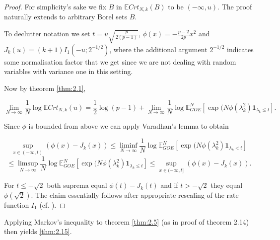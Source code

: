\begin{proof}
	For simplicity's sake we fix $B$ in $\mathbb E Crt_{N,k}(B)$ to be $(-\infty,u)$. The proof naturally extends to arbitrary Borel sets $B$.
	
	To declutter notation we set $t=u\sqrt{\frac{p}{2(p-1)}}$, $\phi(x)=-\frac{p-2}{2p}x^2$ and $J_k(u)=(k+1)I_1(-u;2^{-1/2})$, where the additional argument $2^{-1/2}$ indicates some normalisation factor that we get since we are not dealing with random variables with variance one in this setting.
	
	Now by theorem \ref{thm:2.1},
	
	$$\lim_{N\rightarrow\infty}\frac{1}{N}\log\mathbb E Crt_{N,k}(u) = 
	\frac{1}{2}\log(p-1) + \lim_{N\rightarrow\infty}\frac{1}{N}\log\mathbb E_{GOE}^N[\exp(N\phi(\lambda_k^2)\mathbf 1_{\lambda_k\leq t}].$$
	
	Since $\phi$ is bounded from above we can apply Varadhan's lemma to obtain
	
	$$\sup_{x\in(-\infty,t)}(\phi(x)-J_k(x))\leq\liminf_{N\rightarrow\infty}\frac{1}{N}\log\mathbb E_{GOE}^N[\exp(N\phi(\lambda_k^2)\mathbf 1_{\lambda_k<t}]$$
	$$\leq\limsup_{N\rightarrow\infty}\frac{1}{N}\log\mathbb E_{GOE}^N[\exp(N\phi(\lambda_k^2)\mathbf 1_{\lambda_k\leq t}]\leq\sup_{x\in(-\infty,t]}(\phi(x)-J_k(x)).$$
	
	For $t\leq-\sqrt 2$ both suprema equal $\phi(t)-J_k(t)$ and if $t>-\sqrt 2$ they equal $\phi(\sqrt 2)$. The claim essentially follows after appropriate rescaling of the rate function $I_1$ (cf. \cite{Cerny10}).
\end{proof}

Applying Markov's inequality to theorem \ref{thm:2.5} (as in \cite{Cerny10} proof of theorem 2.14) then yields \ref{thm:2.15}.
